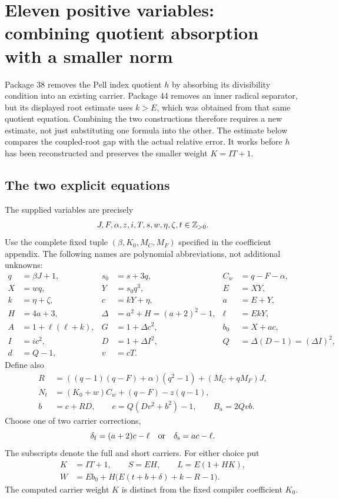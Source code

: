 \section{Eleven positive variables: combining quotient absorption with a smaller norm}
\label{sec:eleven}

Package 38 removes the Pell index quotient $h$ by absorbing its
divisibility condition into an existing carrier. Package 44 removes an
inner radical separator, but its displayed root estimate uses $k>E$,
which was obtained from that same quotient equation. Combining the two
constructions therefore requires a new estimate, not just substituting
one formula into the other. The estimate below compares the coupled-root
gap with the actual relative error. It works before $h$ has been
reconstructed and preserves the smaller weight $K=IT+1$.

\subsection{The two explicit equations}

The supplied variables are precisely
\[
 J,F,\alpha,z,i,T,s,w,\eta,\zeta,t\in\mathbb Z_{>0}.
\]
Use the complete fixed tuple $(\beta,K_0,M_C,M_F)$ specified in the
coefficient appendix. The following names are polynomial abbreviations,
not additional unknowns:
\begin{align*}
 q&=\beta J+1,&s_0&=s+3q,&C_w&=q-F-\alpha,\\
 X&=wq,&Y&=s_0q^3,&E&=XY,\\
 k&=\eta+\zeta,&c&=kY+\eta,&a&=E+Y,\\
 H&=4a+3,&\Delta&=a^2+H=(a+2)^2-1,&\ell&=EkY,\\
 A&=1+\ell(\ell+k),&G&=1+\Delta c^2,&b_0&=X+ac,\\
 I&=ic^2,&D&=1+\Delta I^2,&Q&=\Delta(D-1)=(\Delta I)^2,\\
 d&=Q-1,&v&=cT.
\end{align*}
Define also
\begin{align*}
 R&=((q-1)(q-F)+\alpha)(q^2-1)+(M_C+qM_F)J,\\
 N_t&=(K_0+w)C_w+(q-F)-z(q-1),\\
 b&=c+RD,\qquad e=Q(Dv^2+b^2)-1,\qquad B_a=2Qvb.
\end{align*}
Choose one of two carrier corrections,
\[
 \delta_{\mathrm f}=(a+2)c-\ell
 \quad\hbox{or}\quad
 \delta_{\mathrm s}=ac-\ell.
\]
The subscripts denote the full and short carriers. For either choice put
\begin{equation}\label{eq:eleven-carrier}
 \begin{split}
 K&=IT+1,\qquad S=EH,\qquad L=E(1+HK),\\
 W&=Eb_0+H\bigl(E(t+b+\delta)+k-R-1\bigr).
 \end{split}
\end{equation}
The computed carrier weight $K$ is distinct from the fixed compiler
coefficient $K_0$.

